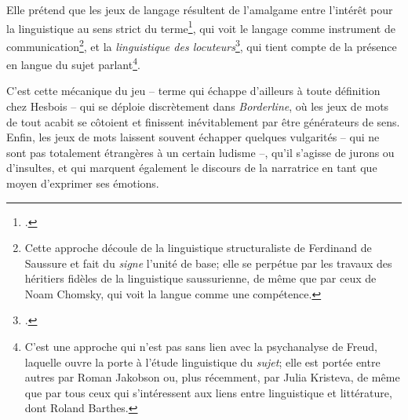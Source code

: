 Elle prétend que les jeux de langage résultent de l'amalgame entre l'intérêt pour la linguistique au sens strict du terme\footcite[17]{Hesbois1986}, qui voit le langage comme instrument de communication\footnote{Cette approche découle de la linguistique structuraliste de Ferdinand de Saussure et fait du \textit{signe} l'unité de base; elle se perpétue par les travaux des héritiers fidèles de la linguistique saussurienne, de même que par ceux de Noam Chomsky, qui voit la langue comme une compétence.}, et la \textit{linguistique des locuteurs}\footcite[17-18]{Hesbois1986}, qui tient compte de la présence en langue du sujet parlant\footnote{C'est une approche qui n'est pas sans lien avec la psychanalyse de Freud, laquelle ouvre la porte à l'étude linguistique du \textit{sujet}; elle est portée entre autres par Roman Jakobson ou, plus récemment, par Julia Kristeva, de même que par tous ceux qui s'intéressent aux liens entre linguistique et littérature, dont Roland Barthes.}.
\par
C'est cette mécanique du jeu -- terme qui échappe d'ailleurs à toute définition chez Hesbois -- qui se déploie discrètement dans \textit{Borderline}, où les jeux de mots de tout acabit se côtoient et finissent inévitablement par être générateurs de sens.
Enfin, les jeux de mots laissent souvent échapper quelques vulgarités -- qui ne sont pas totalement étrangères à un certain ludisme --, qu'il s'agisse de jurons ou d'insultes, et qui marquent également le discours de la narratrice en tant que moyen d'exprimer ses émotions.

